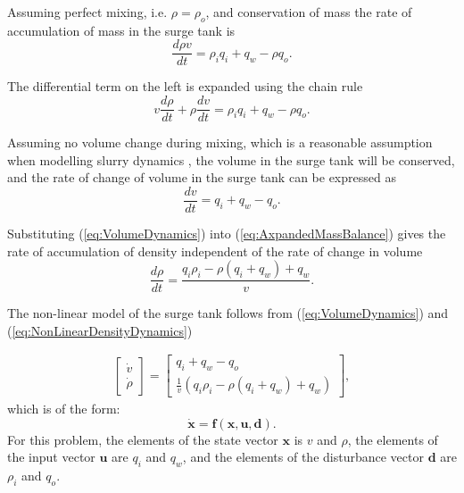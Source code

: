 \documentclass[preprint,authoryear,12pt]{elsarticle}
\begin{document}
Assuming perfect mixing, i.e. $\rho = \rho_o$, and conservation of mass the rate of accumulation of mass in the surge tank is 
\begin{equation}
	\frac{d\rho v}{dt} = \rho_iq_i + q_w - \rho q_o .
\label{eq:MassBalance}
\end{equation}

The differential term on the left is expanded using the chain rule
\begin{equation}
v\frac{d\rho}{dt} + \rho\frac{dv}{dt}= \rho_iq_i + q_w - \rho q_o .
\label{eq:AxpandedMassBalance}
\end{equation}


Assuming no volume change during mixing, which is a reasonable assumption when modelling slurry dynamics \citep{Dontsov2014}, the volume in the surge tank will be conserved, and the rate of change of volume in the surge tank can be expressed as
\begin{equation}
\frac{dv}{dt} = q_i + q_w - q_o.
\label{eq:VolumeDynamics}
\end{equation}

Substituting (\ref{eq:VolumeDynamics}) into (\ref{eq:AxpandedMassBalance}) gives the rate of accumulation of density independent of the rate of change in volume 
\begin{equation}
\frac{d\rho}{dt} = \frac{q_i\rho_i - \rho(q_i + q_w) + q_w}{v}.				 
\label{eq:NonLinearDensityDynamics}
\end{equation}

The non-linear model of the surge tank follows from (\ref{eq:VolumeDynamics}) and (\ref{eq:NonLinearDensityDynamics})

\begin{gather}
	\begin{bmatrix} \dot{v}\\ \dot{\rho} \end{bmatrix}
	=
	\begin{bmatrix} q_i + q_w - q_o \\ \frac{1}{v}(q_i\rho_i - \rho(q_i + q_w) + q_w) \end{bmatrix},
\label{eq:NonLinearStateSpace}
\end{gather}
which is of the form:
\begin{equation}
\boldsymbol{\dot{x}} = \boldsymbol{f}(\boldsymbol{x}, \boldsymbol{u}, \boldsymbol{d}).				 
\label{eq:NonLinearStateSpaceForm}
\end{equation}
For this problem, the elements of the state vector $\boldsymbol{x}$ is $v$ and $\rho$, the elements of the input vector  $\boldsymbol{u}$ are $q_i$ and $q_w$, and the elements of the disturbance vector $\boldsymbol{d}$ are $\rho_i$ and $q_o$.
\end{document}
